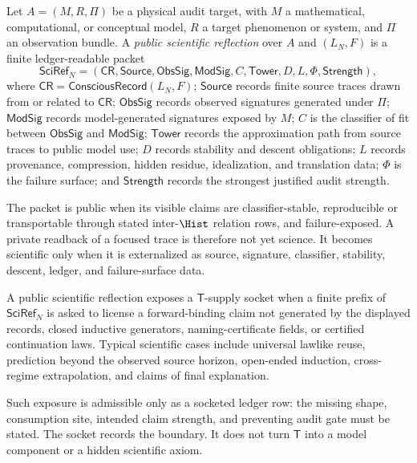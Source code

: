 \begin{definition}
\label{def:public-scientific-reflection}
Let $A=(M,R,\Pi)$ be a physical audit target, with $M$ a mathematical,
computational, or conceptual model, $R$ a target phenomenon or system,
and $\Pi$ an observation bundle. A \emph{public scientific reflection}
over $A$ and $(L_N,F)$ is a finite ledger-readable packet
$$
\mathsf{SciRef}_{N}
=
(\mathsf{CR},
\mathsf{Source},
\mathsf{ObsSig},
\mathsf{ModSig},
C,
\mathsf{Tower},
D,
L,
\Phi,
\mathsf{Strength}),
$$
where $\mathsf{CR}=\mathsf{ConsciousRecord}(L_N,F)$;
$\mathsf{Source}$ records finite source traces drawn from or related to
$\mathsf{CR}$; $\mathsf{ObsSig}$ records observed signatures generated
under $\Pi$; $\mathsf{ModSig}$ records model-generated signatures exposed
by $M$; $C$ is the classifier of fit between $\mathsf{ObsSig}$ and
$\mathsf{ModSig}$; $\mathsf{Tower}$ records the approximation path from
source traces to public model use; $D$ records stability and descent
obligations; $L$ records provenance, compression, hidden residue,
idealization, and translation data; $\Phi$ is the failure surface; and
$\mathsf{Strength}$ records the strongest justified audit strength.

The packet is public when its visible claims are classifier-stable,
reproducible or transportable through stated inter-$\Hist$ relation rows,
and failure-exposed. A private readback of a focused trace is therefore
not yet science. It becomes scientific only when it is externalized as
source, signature, classifier, stability, descent, ledger, and
failure-surface data.
\end{definition}

\begin{definition}
\label{def:t-supply-exposure-by-scientific-inquiry}
A public scientific reflection exposes a $\mathsf{T}$-supply socket when
a finite prefix of $\mathsf{SciRef}_{N}$ is asked to license a
forward-binding claim not generated by the displayed records, closed
inductive generators, naming-certificate fields, or certified
continuation laws. Typical scientific cases include universal lawlike
reuse, prediction beyond the observed source horizon, open-ended
induction, cross-regime extrapolation, and claims of final explanation.

Such exposure is admissible only as a socketed ledger row: the missing
shape, consumption site, intended claim strength, and preventing audit
gate must be stated. The socket records the boundary. It does not turn
$\mathsf{T}$ into a model component or a hidden scientific axiom.
\end{definition}

